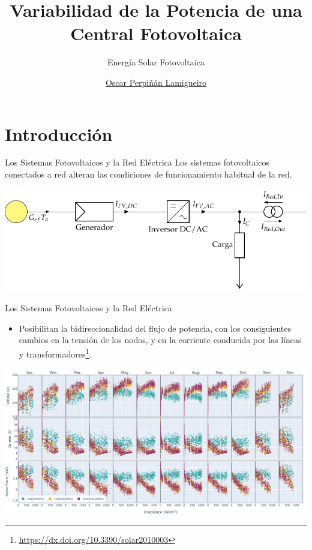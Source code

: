 \documentclass[aspectratio=169, usenames,svgnames,dvipsnames]{beamer}
\author{\href{https://oscarperpinan.github.io}{Oscar Perpiñán Lamigueiro}}
\date{}
\title{Variabilidad de la Potencia de una Central Fotovoltaica}
\subtitle{Energía Solar Fotovoltaica}
\institute[UPM]{Universidad Politécnica de Madrid}
\begin{document}
\maketitle

\section{Introducción}
\label{sec:org6ccbf22}

\begin{frame}[label={sec:org87f83c5}]{Los Sistemas Fotovoltaicos y la Red Eléctrica}
Los sistemas fotovoltaicos conectados a red alteran las condiciones de
funcionamiento habitual de la red.

\begin{center}
\includegraphics[width=\textwidth]{../figs/SFCR_bidireccional.pdf}
\end{center}
\end{frame}

\begin{frame}[label={sec:org44a2cee}]{Los Sistemas Fotovoltaicos y la Red Eléctrica}
\begin{itemize}
\item Posibilitan la bidireccionalidad del flujo de potencia, con los
consiguientes cambios en la tensión de los nodos, y en la corriente
conducida por las líneas y transformadores\footnote{\url{https://dx.doi.org/10.3390/solar2010003}}.
\end{itemize}

\begin{center}
\includegraphics[height=0.65\textheight]{../figs/S_VIP_Irr_line234.pdf}
\end{center}
\end{frame}
\end{document}
